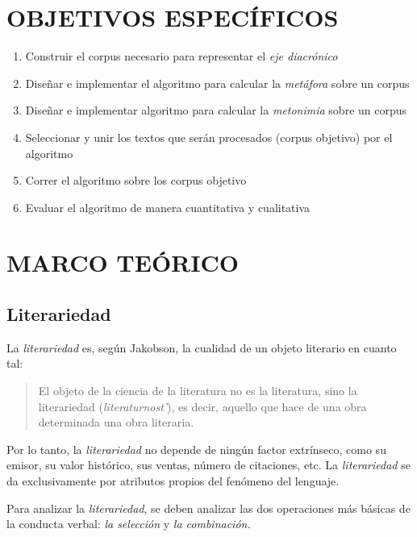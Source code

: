 \documentclass[12pt,letterpaper,twoside]{article}
\begin{document}
\section{OBJETIVOS ESPECÍFICOS}
\label{sec:orgd57a3ea}

\begin{enumerate}
\item Construir el corpus necesario para representar el \emph{eje diacrónico}
\item Diseñar e implementar el algoritmo para calcular la \emph{metáfora} sobre un corpus
\item Diseñar e implementar algoritmo para calcular la \emph{metonimia} sobre un corpus
\item Seleccionar y unir los textos que serán procesados (corpus objetivo) por el algoritmo
\item Correr el algoritmo sobre los corpus objetivo
\item Evaluar el algoritmo de manera cuantitativa y cualitativa
\end{enumerate}

\section{MARCO TEÓRICO}
\label{sec:org0c70b02}

\subsection{Literariedad}
\label{sec:org7aecb9a}


La \emph{literariedad} es, según Jakobson, la cualidad de un objeto
literario en cuanto tal:

\begin{quote}

El objeto de la ciencia de la literatura no es la
literatura, sino la literariedad (\emph{literaturnost'}), es decir,
aquello que hace de una obra determinada una obra
literaria. \cite[pg. 37]{eijembaum2010teoria}
\end{quote}

Por lo tanto, la \emph{literariedad} no depende de ningún factor extrínseco,
como su emisor, su valor histórico, sus ventas,
número de citaciones, etc. La \emph{literariedad} se da exclusivamente por
atributos propios del fenómeno del lenguaje.

Para analizar la \emph{literariedad}, se deben analizar las dos operaciones
más básicas de la conducta verbal: \emph{la selección} y \emph{la combinación.} 
\end{document}
